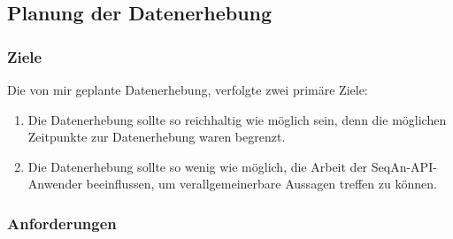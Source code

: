 \subsection{Planung der Datenerhebung}

\subsubsection{Ziele}

Die von mir geplante Datenerhebung, verfolgte zwei primäre Ziele:
\begin{enumerate}
  \item Die Datenerhebung sollte so reichhaltig wie möglich sein, denn die möglichen Zeitpunkte zur Datenerhebung waren begrenzt.
  \item Die Datenerhebung sollte so wenig wie möglich, die Arbeit der SeqAn-API-Anwender beeinflussen, um verallgemeinerbare Aussagen treffen zu können.
\end{enumerate}


\subsubsection{Anforderungen}

